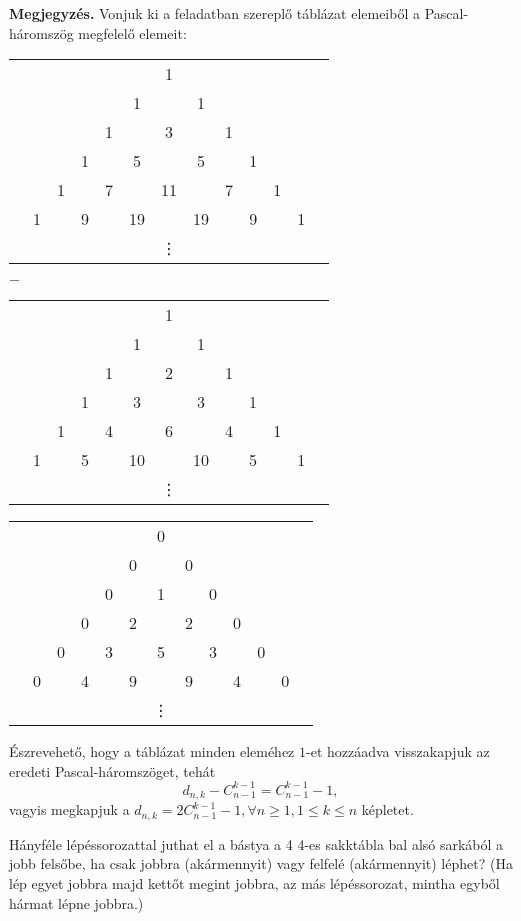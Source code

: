 \begin{solution}
\textbf{Megjegyzés.} Vonjuk ki a feladatban szereplő táblázat elemeiből
a Pascal-háromszög megfelelő elemeit:
\begin{center}
\begin{tabular}{ccccccccccccc}
 &  &  &  &  &  & 1 &  &  &  &  &  & \tabularnewline
 &  &  &  &  & 1 &  & 1 &  &  &  &  & \tabularnewline
 &  &  &  & 1 &  & 3 &  & 1 &  &  &  & \tabularnewline
 &  &  & 1 &  & 5 &  & 5 &  & 1 &  &  & \tabularnewline
 &  & 1 &  & 7 &  & 11 &  & 7 &  & 1 &  & \tabularnewline
 & 1 &  & 9 &  & 19 &  & 19 &  & 9 &  & 1 & \tabularnewline
 &  &  &  &  &  & \vdots &  &  &  &  &  & \tabularnewline
\end{tabular}\hspace{0.2cm} $-$ \hfill{}%
\begin{tabular}{ccccccccccccc}
 &  &  &  &  &  & 1 &  &  &  &  &  & \tabularnewline
 &  &  &  &  & 1 &  & 1 &  &  &  &  & \tabularnewline
 &  &  &  & 1 &  & 2 &  & 1 &  &  &  & \tabularnewline
 &  &  & 1 &  & 3 &  & 3 &  & 1 &  &  & \tabularnewline
 &  & 1 &  & 4 &  & 6 &  & 4 &  & 1 &  & \tabularnewline
 & 1 &  & 5 &  & 10 &  & 10 &  & 5 &  & 1 & \tabularnewline
 &  &  &  &  &  & \vdots &  &  &  &  &  & \tabularnewline
\end{tabular}
\par\end{center}
\begin{center}
\begin{tabular}{ccccccccccccc}
 &  &  &  &  &  & 0 &  &  &  &  &  & \tabularnewline
 &  &  &  &  & 0 &  & 0 &  &  &  &  & \tabularnewline
 &  &  &  & 0 &  & 1 &  & 0 &  &  &  & \tabularnewline
 &  &  & 0 &  & 2 &  & 2 &  & 0 &  &  & \tabularnewline
 &  & 0 &  & 3 &  & 5 &  & 3 &  & 0 &  & \tabularnewline
 & 0 &  & 4 &  & 9 &  & 9 &  & 4 &  & 0 & \tabularnewline
 &  &  &  &  &  & \vdots &  &  &  &  &  & \tabularnewline
\end{tabular}
\par\end{center}
Észrevehető, hogy a táblázat minden eleméhez $1$-et hozzáadva visszakapjuk
az eredeti Pascal-háromszöget, tehát 
\[
d_{n,k}-C_{n-1}^{k-1}=C_{n-1}^{k-1}-1,
\]
vagyis megkapjuk a $d_{n,k}=2C_{n-1}^{k-1}-1,\forall n\geq1,1\leq k\leq n$
képletet. 
\end{solution}
\begin{extraproblem}
Hányféle lépéssorozattal juthat el a bástya a 4 \texttimes{} 4-es
sakktábla bal alsó sarkából a jobb felsőbe, ha csak jobbra (akármennyit)
vagy felfelé (akármennyit) léphet? (Ha lép egyet jobbra majd kettőt
megint jobbra, az más lépéssorozat, mintha egyből hármat lépne jobbra.) 
\end{extraproblem}

